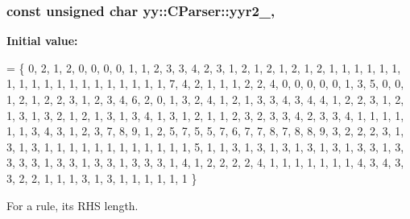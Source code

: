 \hypertarget{classyy_1_1CParser_a033a79c9242cc952389e582ad2c6d5db}{
\subsubsection[{yyr2\-\_\-}]{\setlength{\rightskip}{0pt plus 5cm}const unsigned char yy\-::\-C\-Parser\-::yyr2\-\_\-\hspace{0.3cm}{\ttfamily [static]}, {\ttfamily [private]}}}\label{classyy_1_1CParser_a033a79c9242cc952389e582ad2c6d5db}
{\bfseries Initial value\-:}
\begin{DoxyCode}
=
  \{
         0,     2,     1,     2,     0,     0,     0,     0,     1,     1,
       2,     3,     3,     4,     2,     3,     1,     2,     1,     2,
       1,     2,     1,     2,     1,     1,     1,     1,     1,     1,
       1,     1,     1,     1,     1,     1,     1,     1,     1,     1,
       1,     1,     1,     7,     4,     2,     1,     1,     1,     2,
       2,     4,     0,     0,     0,     0,     0,     1,     3,     5,
       0,     0,     1,     2,     1,     2,     2,     3,     1,     2,
       3,     4,     6,     2,     0,     1,     3,     2,     4,     1,
       2,     1,     3,     3,     4,     3,     4,     4,     1,     2,
       2,     3,     1,     2,     1,     3,     1,     3,     2,     1,
       2,     1,     3,     1,     3,     4,     1,     3,     1,     2,
       1,     1,     2,     3,     2,     3,     3,     4,     2,     3,
       3,     4,     1,     1,     1,     1,     1,     1,     3,     4,
       3,     1,     2,     3,     7,     8,     9,     1,     2,     5,
       7,     5,     5,     7,     6,     7,     7,     8,     7,     8,
       8,     9,     3,     2,     2,     2,     3,     1,     3,     1,
       3,     1,     1,     1,     1,     1,     1,     1,     1,     1,
       1,     1,     1,     5,     1,     1,     3,     1,     3,     1,
       3,     1,     3,     1,     3,     1,     3,     3,     1,     3,
       3,     3,     3,     1,     3,     3,     1,     3,     3,     1,
       3,     3,     3,     1,     4,     1,     2,     2,     2,     2,
       4,     1,     1,     1,     1,     1,     1,     1,     4,     3,
       4,     3,     3,     2,     2,     1,     1,     1,     3,     1,
       3,     1,     1,     1,     1,     1,     1
  \}
\end{DoxyCode}


For a rule, its R\-H\-S length. 

